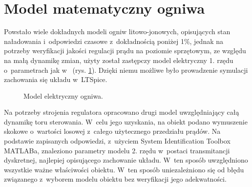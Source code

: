 \documentclass[polish,engineer]{polsl-msth}
\begin{document}
\section{Model matematyczny ogniwa}
Powstało wiele dokładnych modeli\cite{1634598_BATT_MODELS} ogniw litowo-jonowych, opisujących stan naładowania i~odpowiedzi czasowe z~dokładnością poniżej 1\%, jednak na potrzeby weryfikacji jakości regulacji prądu na poziomie sprzętowym, ze względu na małą dynamikę zmian, użyty został zastępczy model elektryczny 1. rzędu o~parametrach jak w~\cite{8759769_cellmodel1storder} (rys. \ref{img:thevenin_model}). Dzięki niemu możliwe było prowadzenie symulacji zachowania się układu w~LTSpice.
\begin{figure}[hbtp]
    \centering
     \caption{Model elektryczny ogniwa.\label{img:thevenin_model}}
\end{figure}

Na potrzeby strojenia regulatora opracowano drugi model uwzględniający całą dynamikę toru sterowania. W~celu jego uzyskania, na obiekt podano wymuszenie skokowe o~wartości losowej z~całego użytecznego przedziału prądów. Na podstawie zapisanych odpowiedzi, z~użyciem System Identification Toolbox MATLABa, znaleziono parametry modelu 2. rzędu w~postaci transmitancji dyskretnej, najlepiej opisującego zachowanie układu. W~ten sposób uwzględniono wszystkie ważne właściwości obiektu. W~ten sposób uniezależniono się od błędu związanego z~wyborem modelu obiektu bez weryfikacji jego adekwatności.
\end{document}

